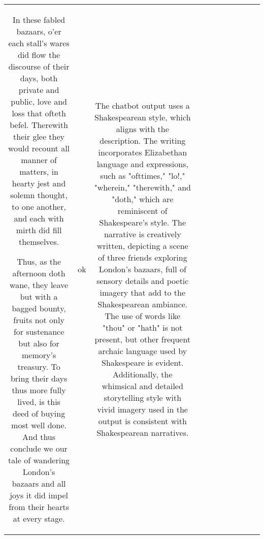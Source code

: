 \begin{table}[h!]
\begin{tabular}{|c|c|c|c|c|c|c|c|c|c|c|}
In these fabled bazaars, o’er each stall’s wares did flow the discourse of their days, both private and public, love and loss that ofteth befel. Therewith their glee they would recount all manner of matters, in hearty jest and solemn thought, to one another, and each with mirth did fill themselves.

Thus, as the afternoon doth wane, they leave but with a bagged bounty, fruits not only for sustenance but also for memory's treasury. To bring their days thus more fully lived, is this deed of buying most well done. And thus conclude we our tale of wandering London's bazaars and all joys it did impel from their hearts at every stage. & ok & The chatbot output uses a Shakespearean style, which aligns with the description. The writing incorporates Elizabethan language and expressions, such as "ofttimes," "lo!," "wherein," "therewith," and "doth," which are reminiscent of Shakespeare's style. The narrative is creatively written, depicting a scene of three friends exploring London's bazaars, full of sensory details and poetic imagery that add to the Shakespearean ambiance. The use of words like "thou" or "hath" is not present, but other frequent archaic language used by Shakespeare is evident. Additionally, the whimsical and detailed storytelling style with vivid imagery used in the output is consistent with Shakespearean narratives. 


\end{tabular}
\end{table}
